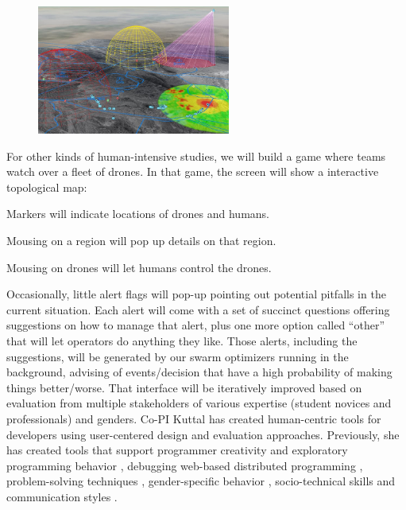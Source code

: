 \begin{figure}
\includegraphics[width=2.5in]{fig/ewpmt.jpg}
\end{figure}
For other kinds of human-intensive studies, we will build a game where teams watch over a fleet of drones.
In that game, the screen will show a interactive topological map:
\bi 
\item    Markers will indicate locations  of   drones and humans.
\item Mousing on a region  will pop up   details on that region.
\item Mousing on drones will let humans     control the drones.
\item
Occasionally, little alert flags will pop-up pointing out potential pitfalls in the current situation. Each alert will come with a set of succinct questions offering suggestions on how to manage that alert,
plus one more option called ``other'' that will let operators do anything they like. Those alerts, including the suggestions,  will  be generated by our swarm optimizers running in the background, advising of events/decision that have  a high probability of making things better/worse. 
\ei
That interface will be iteratively improved based on evaluation from multiple stakeholders of various expertise (student novices and professionals) and genders. Co-PI Kuttal has created human-centric tools for developers using user-centered design and evaluation approaches.  
Previously, she has created tools that support programmer creativity \cite{Kuttal2020} and exploratory programming behavior \cite{Jernigan2017, Jernigan2015}, debugging web-based distributed programming \cite{KuttalSR13-chi, KuttalSBRKS19}, %
problem-solving techniques \cite{Jernigan2017, Jernigan2015}, gender-specific behavior \cite{Kuttal2021g, Kuttal2019, Alexposter2022}, socio-technical skills \cite{Abimposter2022,Abimgitposter2022,Diwanjiposter2022,Zhou2018, sarma2016hiring, KuttalCWBS21, KuttalSRW18, abs-1810-13062} and communication styles \cite{Kuttal2020}.



